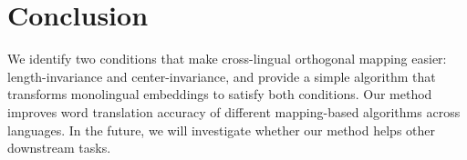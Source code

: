 \section{Conclusion}

We identify two conditions that make cross-lingual orthogonal mapping easier:
length-invariance and center-invariance, and provide a simple algorithm that
transforms monolingual embeddings to satisfy both conditions.  Our method
improves word translation accuracy of different mapping-based 
algorithms across languages.
In the future, we will investigate whether our method helps other downstream
tasks.
